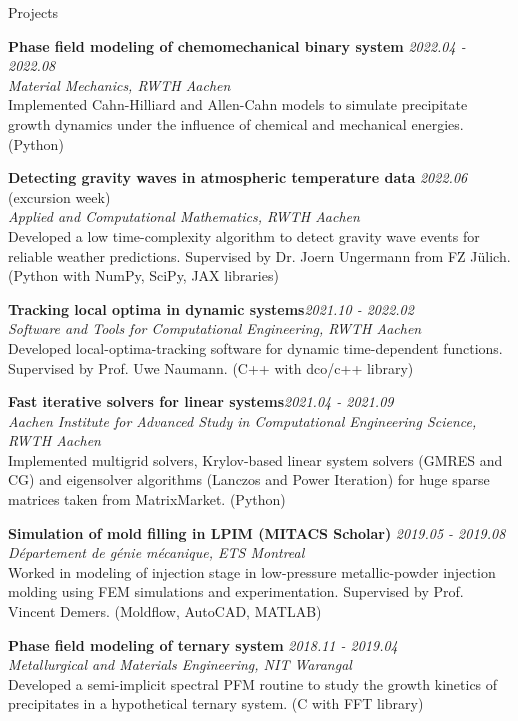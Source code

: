 \documentclass{resume}
\begin{document}
\begin{rSection}{Projects}

{\bf Phase field modeling of chemomechanical binary system} \hfill {\em 2022.04 - 2022.08}\\
{\em Material Mechanics, RWTH Aachen}\\
Implemented Cahn-Hilliard and Allen-Cahn models to simulate precipitate growth dynamics under the influence of chemical and mechanical energies. (Python) 

{\bf Detecting gravity waves in atmospheric temperature data} \hfill {\em2022.06} (excursion week)\\
{\em Applied and Computational Mathematics, RWTH Aachen}\\
Developed a low time-complexity algorithm to detect gravity wave events for reliable weather predictions. Supervised by Dr. Joern Ungermann from FZ Jülich. (Python with NumPy, SciPy, JAX libraries)

{\bf Tracking local optima in dynamic systems}\hfill {\em 2021.10 - 2022.02}\\
{\em Software and Tools for Computational Engineering, RWTH Aachen}\\
Developed local-optima-tracking software for dynamic time-dependent functions. Supervised by Prof. Uwe Naumann. (C++ with dco/c++ library)

{\bf Fast iterative solvers for linear systems}\hfill {\em 2021.04 - 2021.09}\\
{\em Aachen Institute for Advanced Study in Computational Engineering Science, RWTH Aachen}\\
Implemented multigrid solvers, Krylov-based linear system solvers (GMRES and CG) and eigensolver algorithms (Lanczos and Power Iteration) for huge sparse matrices taken from MatrixMarket. (Python)

{\bf Simulation of mold filling in LPIM (MITACS Scholar)} \hfill {\em 2019.05 - 2019.08}\\
{\em Département de génie mécanique, ETS Montreal}\\
Worked in modeling of injection stage in low-pressure metallic-powder injection molding using FEM simulations and experimentation. Supervised by Prof. Vincent Demers. (Moldflow, AutoCAD, MATLAB)

{\bf Phase field modeling of ternary system} \hfill {\em 2018.11 - 2019.04}\\
{\em Metallurgical and Materials Engineering, NIT Warangal}\\
Developed a semi-implicit spectral PFM routine to study the growth kinetics of precipitates in a hypothetical ternary system. (C with FFT library)
\end{rSection}
\end{document}
